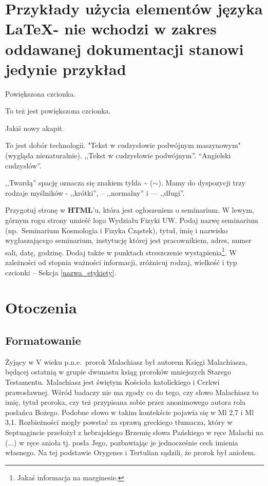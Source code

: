 \documentclass[12pt,a4paper]{article}
\begin{document}
\section{Przykłady użycia elementów języka \LaTeX - nie wchodzi w zakres oddawanej dokumentacji stanowi jedynie przykład}
\begin{large}Powiększona czcionka.\end{large}
{\large To też jest powiększona czcionka.}

Jakiś nowy akapit.



To jest dobór technologii.
"Tekst w cudzysłowie podwójnym maszynowym" (wygląda nienaturalnie).
,,Tekst w cudzysłowie podwójnym''. ``Angielski cudzysłów''.

,,Twardą'' spację oznacza się znakiem tylda \~{} ($\sim$).
Mamy do dyspozycji trzy rodzaje myślników - ,,krótki'', -- ,,normalny'' i --- ,,długi''.

\label{nazwa_etykiety}

Przygotuj stronę w \textbf{HTML}'u, która jest ogłoszeniem o seminarium.
W lewym, górnym rogu strony umieść logo Wydziału Fizyki UW.
Podaj nazwę seminarium (np.~Seminarium Kosmologia i Fizyka Cząstek),
tytuł, imię i nazwisko  wygłaszającego seminarium,
instytucję której jest pracownikiem,
adres, numer sali, datę, godzinę.
 Dodaj także w punktach streszczenie wystąpienia\footnote{Jakaś informacja na marginesie.}.
 W zależności od stopnia ważności informacji, zróżnicuj rodzaj,
wielkość i typ czcionki -- Sekcja \ref{nazwa_etykiety}.

\section{Otoczenia}

\subsection{Formatowanie}

Żyjący w V wieku p.n.e.~prorok Malachiasz był autorem Księgi Malachiasza, będącej
ostatnią w grupie dwunastu ksiąg proroków mniejszych Starego Testamentu. Malachiasz jest
świętym Kościoła katolickiego i Cerkwi prawosławnej. Wśród badaczy nie ma zgody co do
tego, czy słowo Malachiasz to imię, tytuł proroka, czy też przypisana sobie przez
anonimowego autora rola posłańca Bożego. Podobne słowo w takim kontekście pojawia
się w Ml 2,7 i Ml 3,1. Rozbieżności mogły powstać za sprawą greckiego tłumacza, który
w Septuagincie przełożył z hebrajskiego Brzemię słowa Pańskiego w ręce Malachi na
(...) w ręce anioła tj. posła Jego, pozbawiając je jednocześnie cech
imienia własnego. Na tej podstawie Orygenes i Tertulian sądzili, że prorok był aniołem.
\end{document}
